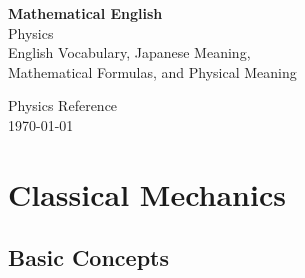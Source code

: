 \documentclass[11pt,a4paper]{article}
\begin{document}
\begin{titlepage}
    \centering

    \vspace*{2cm}

    {\Huge\bfseries Mathematical English}\\[0.5cm]
    {\LARGE Physics}\\[1.5cm]

    {\large
    English Vocabulary, Japanese Meaning,\\
    Mathematical Formulas, and Physical Meaning
    }

    \vfill

    {\large
    Physics Reference\\
    \today
    }

\end{titlepage}

\tableofcontents
\newpage

\section{Classical Mechanics}

\subsection{Basic Concepts}
\end{document}
